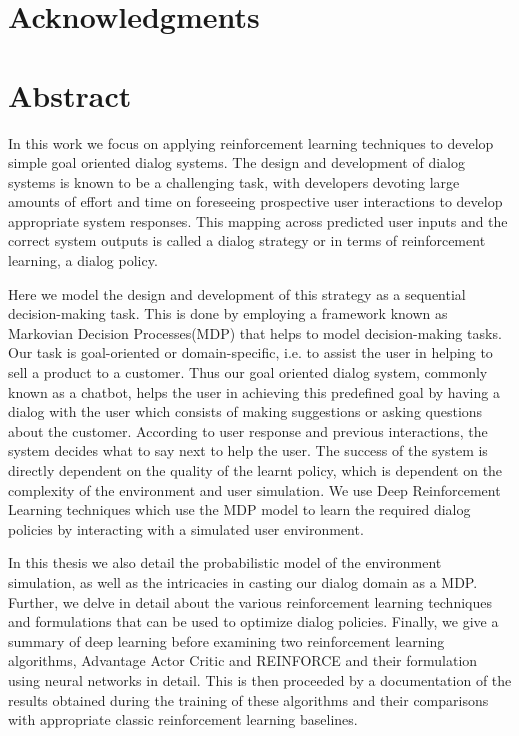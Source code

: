 \documentclass[14pt]{extarticle}
\numberwithin{equation}{section}
\begin{document}
	\section*{Acknowledgments}
	\clearpage
	
	\section*{Abstract}
	In this work we focus on applying reinforcement learning techniques to develop simple goal oriented dialog systems. The design and development of dialog systems is known to be a challenging task, with developers devoting  large amounts of effort and time on foreseeing prospective user interactions to develop appropriate system responses. This mapping across predicted user inputs and the correct system outputs is called a dialog strategy or in terms of reinforcement learning, a dialog policy.
	
	Here we model the design and development of this strategy as a sequential decision-making task. This is done by employing a framework known as Markovian Decision Processes(MDP) that helps to model decision-making tasks. Our task is goal-oriented or domain-specific, i.e. to assist the user in helping to sell a product to a customer. Thus our goal oriented dialog system, commonly known as a chatbot, helps the user in achieving this predefined goal by having a dialog with the user which consists of making suggestions or asking questions about the customer. According to user response and previous interactions, the system decides what to say next to help the user. The success of the system is directly dependent on the quality of the learnt policy, which is dependent on the complexity of the environment and user simulation. We use Deep Reinforcement Learning techniques which use the MDP model to learn the required dialog policies by interacting with a simulated user environment. 
	
	In this thesis we also detail the probabilistic model of the environment simulation, as well as the intricacies in casting our dialog domain as a MDP. Further, we delve in detail about the various reinforcement learning techniques and formulations that can be used to optimize dialog policies. Finally, we give a summary of deep learning before examining two reinforcement learning algorithms, Advantage Actor Critic and REINFORCE and their formulation using neural networks in detail. This is then proceeded by a documentation of the results obtained during the training of these algorithms and their comparisons with appropriate classic reinforcement learning baselines. 
	\clearpage
	\tableofcontents
	
\end{document}
